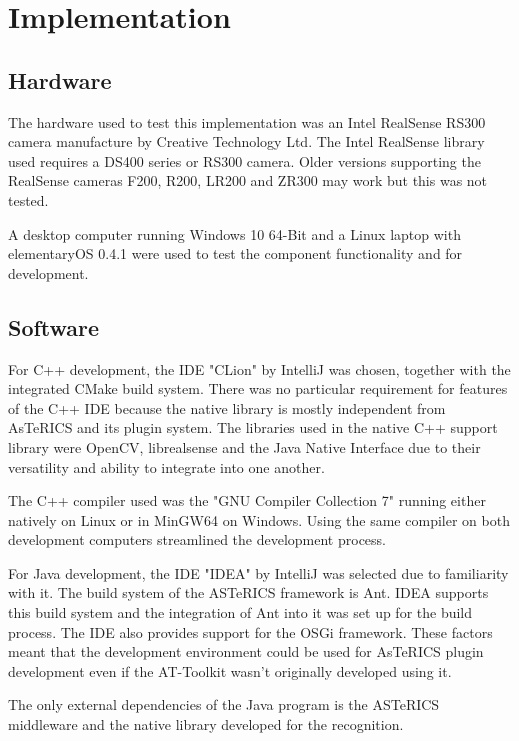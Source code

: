 \documentclass[BSA,Bachelor,english]{twbook}%
\begin{document}
\chapter{Implementation}

\section{Hardware}

The hardware used to test this implementation was an Intel RealSense RS300 camera manufacture by Creative Technology Ltd. The Intel RealSense library used requires a DS400 series or RS300 camera\cite{REALSENSE}. Older versions supporting the RealSense cameras F200, R200, LR200 and ZR300 may work but this was not tested.

A desktop computer running Windows 10 64-Bit and a Linux laptop with elementaryOS 0.4.1 were used to test the component functionality and for development. 

\section{Software}
For C++ development, the IDE "CLion" by IntelliJ was chosen, together with the integrated CMake build system. There was no particular requirement for features of the C++ IDE because the native library is mostly independent from AsTeRICS and its plugin system. The libraries used in the native C++ support library were OpenCV, librealsense and the Java Native Interface due to their versatility and ability to integrate into one another\cite{JNI}.

The C++ compiler used was the "GNU Compiler Collection 7" running either natively on Linux or in MinGW64 on Windows. Using the same compiler on both development computers streamlined the development process.

For Java development, the IDE "IDEA" by IntelliJ was selected due to familiarity with it. The build system of the ASTeRICS framework is Ant. IDEA supports this build system and the integration of Ant into it was set up for the build process. The IDE also provides support for the OSGi framework. These factors meant that the development environment could be used for AsTeRICS plugin development even if the AT-Toolkit wasn't originally developed using it. 

The only external dependencies of the Java program is the ASTeRICS middleware and the native library developed for the recognition.

\newpage
\end{document}
